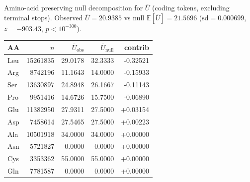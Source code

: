 Amino-acid preserving null decomposition for $\overline{U}$ (coding tokens, excluding terminal stops). Observed $\overline{U}=20.9385$ vs null $\mathbb{E}[\overline{U}]=21.5696$ ($\mathrm{sd}=0.000699$, $z=-903.43$, $p<10^{-300}$).
\begin{center}
\scriptsize
\setlength{\tabcolsep}{4pt}
\renewcommand{\arraystretch}{1.10}
\begin{tabular}{lrrrr}
\toprule
AA & $n$ & $\bar{U}_{\mathrm{obs}}$ & $\bar{U}_{\mathrm{null}}$ & contrib \\
\midrule
Leu & 15261835 & 29.0178 & 32.3333 & -0.32521 \\
Arg & 8742196 & 11.1643 & 14.0000 & -0.15933 \\
Ser & 13630897 & 24.8948 & 26.1667 & -0.11143 \\
Pro & 9951416 & 14.6726 & 15.7500 & -0.06890 \\
Glu & 11382950 & 27.9311 & 27.5000 & +0.03154 \\
Asp & 7458614 & 27.5465 & 27.5000 & +0.00223 \\
Ala & 10501918 & 34.0000 & 34.0000 & +0.00000 \\
Asn & 5721827 & 0.0000 & 0.0000 & +0.00000 \\
Cys & 3353362 & 55.0000 & 55.0000 & +0.00000 \\
Gln & 7781587 & 0.0000 & 0.0000 & +0.00000 \\
\bottomrule
\end{tabular}
\end{center}
